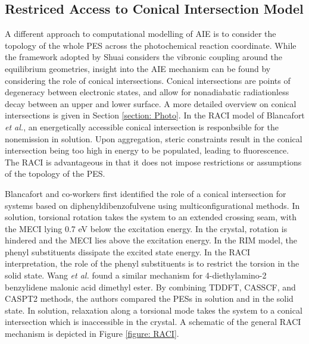 \subsection{Restriced Access to Conical Intersection Model}\label{section: lom RACI}
A different approach to computational modelling of AIE is to consider the topology of the whole \ac{PES} across the photochemical reaction coordinate. While the framework adopted by Shuai considers the vibronic coupling around the equilibrium geometries, insight into the AIE mechanism can be found by considering the role of conical intersections. Conical intersections are points of degeneracy between electronic states, and allow for nonadiabatic radiationless decay between an upper and lower surface. A more detailed overview on conical intersections is given in Section \ref{section: Photo}. In the \ac{RACI} model of Blancafort \textit{et al.}, an energetically accessible conical intersection is responbsible for the nonemission in solution. Upon aggregation, steric constraints result in the conical intersection being too high in energy to be populated, leading to fluorescence.\cite{Peng2016} The \ac{RACI} is advantageous in that it does not impose restrictions or assumptions of the topology of the \ac{PES}.  

Blancafort and co-workers first identified the role of a conical intersection for systems based on diphenyldibenzofulvene using multiconfigurational methods.\cite{Li2013} In solution, torsional rotation takes the system to an extended crossing seam, with the \ac{MECI} lying 0.7 eV below the excitation energy. In the crystal, rotation is hindered and the \ac{MECI} lies above the excitation energy. In the RIM model, the phenyl substituents dissipate the excited state energy. In the RACI interpretation, the role of the phenyl substituents is to restrict the torsion in the solid state. Wang \textit{et al.} found a similar mechanism for 4-diethylamino-2 benzylidene malonic acid dimethyl ester. \cite{Wang2016} By combining TDDFT, CASSCF, and CASPT2 methods, the authors compared the \acp{PES} in solution and in the solid state. In solution, relaxation along a torsional mode takes the system to a conical intersection which is inaccessible in the crystal. A schematic of the general \ac{RACI} mechanism is depicted in Figure \ref{figure: RACI}.

